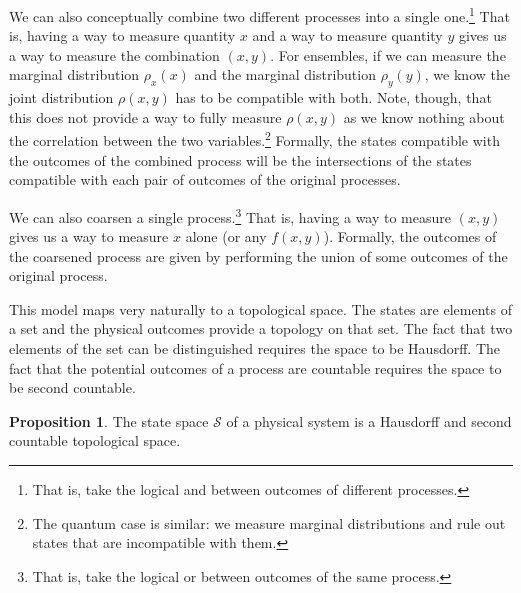 \documentclass[aps,pra,10pt,twocolumn,floatfix,nofootinbib]{revtex4-1}
\numberwithin{equation}{section}
\theoremstyle{definition}
\newtheorem{prop}[equation]{Proposition}
\begin{document}
We can also conceptually combine two different processes into a single one.\footnote{That is, take the logical and between outcomes of different processes.} That is, having a way to measure quantity $x$ and a way to measure quantity $y$ gives us a way to measure the combination $(x,y)$. For ensembles, if we can measure the marginal distribution $\rho_x(x)$ and the marginal distribution $\rho_y(y)$, we know the joint distribution $\rho(x,y)$ has to be compatible with both. Note, though, that this does not provide a way to fully measure $\rho(x,y)$ as we know nothing about the correlation between the two variables.\footnote{The quantum case is similar: we measure marginal distributions and rule out states that are incompatible with them.} Formally, the states compatible with the outcomes of the combined process will be the intersections of the states compatible with each pair of outcomes of the original processes.

We can also coarsen a single process.\footnote{That is, take the logical or between outcomes of the same process.} That is, having a way to measure $(x,y)$ gives us a way to measure $x$ alone (or any $f(x,y)$). Formally, the outcomes of the coarsened process are given by performing the union of some outcomes of the original process.

This model maps very naturally to a topological space. The states are elements of a set and the physical outcomes provide a topology on that set. The fact that two elements of the set can be distinguished requires the space to be Hausdorff. The fact that the potential outcomes of a process are countable requires the space to be second countable.

\begin{prop}\label{prop:state_topology}
The state space $\mathcal{S}$ of a physical system is a Hausdorff and second countable topological space.
\end{prop}
\end{document}
